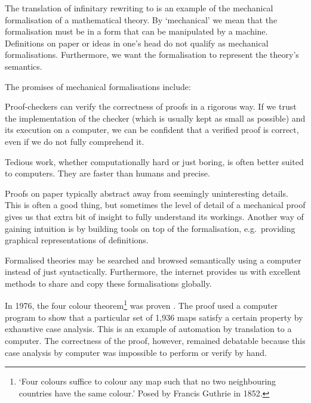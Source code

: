 The translation of infinitary rewriting to \Coq is an example of the
mechanical formalisation of a mathematical theory. By `mechanical' we
mean that the formalisation must be in a form that can be manipulated
by a machine. Definitions on paper or ideas in one's head do not
qualify as mechanical formalisations. Furthermore, we want the
formalisation to represent the theory's semantics.

The promises of mechanical formalisations include:
\begin{compactdesc}
  \item[\normalfont{\emph{Confidence}}\hskip .5em]
    Proof-checkers can verify the correctness of proofs in a rigorous
    way. If we trust the implementation of the checker (which is
    usually kept as small as possible) and its execution on a
    computer, we can be confident that a verified proof is correct,
    even if we do not fully comprehend it.
  \item[\normalfont{\emph{Automation}}\hskip .5em]
    Tedious work, whether computationally hard or just boring, is
    often better suited to computers. They are faster than humans and
    precise.
  \item[\normalfont{\emph{Intuition}}\hskip .5em]
    Proofs on paper typically abstract away from seemingly
    uninteresting  details. This is often a good thing, but sometimes
    the level of detail of a mechanical proof gives us that extra bit
    of insight to fully understand its workings. Another way of
    gaining intuition is by building tools on top of the
    formalisation, e.g.\ providing graphical representations of
    definitions.
  \item[\normalfont{\emph{Availability}}\hskip .5em]
    Formalised theories may be searched and browsed semantically using
    a computer instead of just syntactically. Furthermore, the
    internet provides us with excellent methods to share and copy
    these formalisations globally.
\end{compactdesc}

In 1976, the four colour theorem\footnote{`Four colours suffice to
  colour any map such that no two neighbouring countries have the same
  colour.' Posed by Francis Guthrie in 1852. } was proven
\citep{appel-haken-76}. The proof used a computer program to show that
a particular set of 1,936 maps satisfy a certain property by
exhaustive case analysis. This is an
example of automation by translation to a computer. The correctness of
the proof, however, remained debatable because this case analysis by
computer was impossible to perform or verify by hand.

